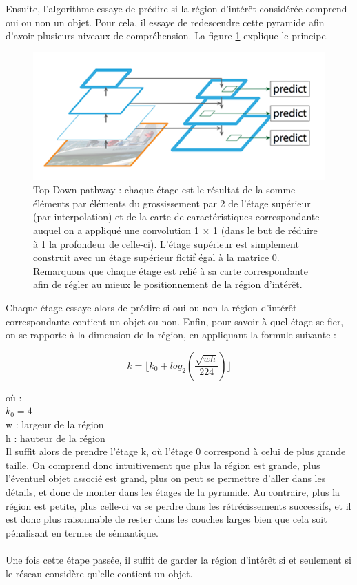 Ensuite, l'algorithme essaye de prédire si la région d'intérêt considérée comprend oui ou non un objet. Pour cela, il essaye de redescendre cette pyramide afin d'avoir plusieurs niveaux de compréhension. La figure \ref{FPN_2} explique le principe.

\begin{figure}[!h]
\centering
\includegraphics[width=200pts]{images/Mask_R_CNN/FPN_2.png} 
\caption{Top-Down pathway : chaque étage est le résultat de la somme éléments par éléments du grossissement par 2 de l'étage supérieur (par interpolation) et de la carte de caractéristiques correspondante auquel on a appliqué une convolution 1 $\times$ 1 (dans le but de réduire à 1 la profondeur de celle-ci). L'étage supérieur est simplement construit avec un étage supérieur fictif égal à la matrice 0. Remarquons que chaque étage est relié à sa carte correspondante afin de régler au mieux le positionnement de la région d'intérêt.}
\label{FPN_2}
\end{figure}

Chaque étage essaye alors de prédire si oui ou non la région d'intérêt correspondante contient un objet ou non. Enfin, pour savoir à quel étage se fier, on se rapporte à la dimension de la région, en appliquant la formule suivante :

$$k = \lfloor k_0 + log_2( \frac{ \sqrt{wh}}{224} ) \rfloor $$

où :\\
$k_0 = 4$\\
w : largeur de la région\\
h : hauteur de la région\\

Il suffit alors de prendre l'étage k, où l'étage 0 correspond à celui de plus grande taille. On comprend donc intuitivement que plus la région est grande, plus l'éventuel objet associé est grand, plus on peut se permettre d'aller dans les détails, et donc de monter dans les étages de la pyramide. Au contraire, plus la région est petite, plus celle-ci va se perdre dans les rétrécissements successifs, et il est donc plus raisonnable de rester dans les couches larges bien que cela soit pénalisant en termes de sémantique.\\
\\
Une fois cette étape passée, il suffit de garder la région d'intérêt si et seulement si le réseau considère qu'elle contient un objet.

